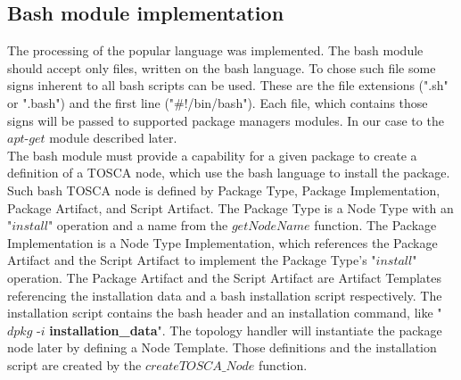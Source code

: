 \subsection*{Bash module implementation}
The processing of the popular language was implemented. 
The bash module should accept only files, written on the bash language.
To chose such file some signs inherent to all bash scripts can be used. 
These are the file extensions (".sh" or ".bash") and the first line ("\#!/bin/bash"). 
Each file, which contains those signs will be passed to supported package managers modules.
In our case to the $apt$-$get$ module described later. \\
The bash module must provide a capability for a given package to create a definition of a TOSCA node, which use the bash language to install the package.
Such bash TOSCA node is defined by Package Type, Package Implementation, Package Artifact, and Script Artifact.
The Package Type is a Node Type with an "$install$" operation and a name from the $getNodeName$ function.
The Package Implementation is a Node Type Implementation, which references the Package Artifact and the Script Artifact to implement the Package Type's "$install$" operation.
The Package Artifact and the Script Artifact are Artifact Templates referencing the installation data and a bash installation script respectively.
The installation script contains the bash header and an installation command, like "$dpkg$ -$i$ \textbf{installation\_data}".
The topology handler will instantiate the package node later by defining a Node Template.
Those definitions and the installation script are created by the $createTOSCA\_Node$ function.

